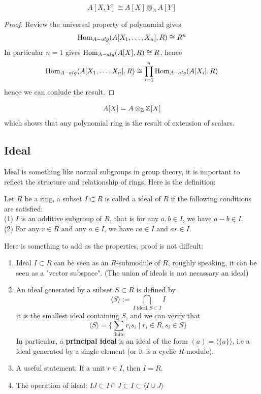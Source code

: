 \begin{claim}
    \[A[X,Y] \cong A[X] \otimes_A A[Y]\]
\end{claim}
\begin{proof}
    Review the universal property of polynomial gives
    \[\operatorname{Hom}_{A-alg}(A[X_1,\dots,X_n],R) \cong R^n\]
    In particular \(n=1\) gives \(\operatorname{Hom}_{A-alg}(A[X],R) \cong R\), hence 
    \[\operatorname{Hom}_{A-alg}(A[X_1,\dots,X_n],R) \cong \prod_{i=1}^n \operatorname{Hom}_{A-alg}(A[X_i],R)\]
    hence we can conlude the result.
\end{proof}
\begin{claim}
    \[A[X] = A \otimes_{\mathbb{Z}} \mathbb{Z}[X] \]
    which shows that any polynomial ring is the result of extension of scalars.
\end{claim}




\subsection{Ideal}
Ideal is something like normal subgroups in group theory, it is important to reflect the structure and relationship of rings. Here is the definition:
\begin{definition}
    Let \(R\) be a ring, a subset \(I \subset R\) is called a ideal of \(R\) if the following conditions are satisfied:\\
    (1) \(I\) is an additive subgroup of \(R\), that is for any \(a,b \in I\), we have \(a-b \in I\).\\
    (2) For any \(r \in R\) and any \(a \in I\), we have \(ra \in I\) and \(ar \in I\).
\end{definition}

    Here is something to add as the properties, proof is not diffcult: 
    \begin{enumerate}
        \item Ideal \(I \subset R\) can be seen as an \(R\)-submodule of \(R\), roughly speaking, it can be seen as a "vector subspace". (The union of ideals is not necassary an ideal)

        \item An ideal generated by a subset \(S \subset R\) is defined by 
    \[\langle S \rangle := \bigcap_{I \text{ ideal}, S \subset I} I\]
    it is the smallest ideal containing \(S\), and we can verify that
    \[\langle S \rangle = \{\sum_{\text{finite}} r_i s_i \mid r_i \in R, s_i \in S\}\]
    In particular, a \textbf{principal ideal} is an ideal of the form \((a) = \langle \{a\} \rangle\), i.e a ideal generated by a single element (or it is a cyclic \(R\)-module).

        \item A useful statement: If a unit \(r \in I\), then \(I = R\).

        \item The operation of ideal: \(IJ \subset I\cap J \subset I \subset \langle I\cup J \rangle\)
    \end{enumerate}


